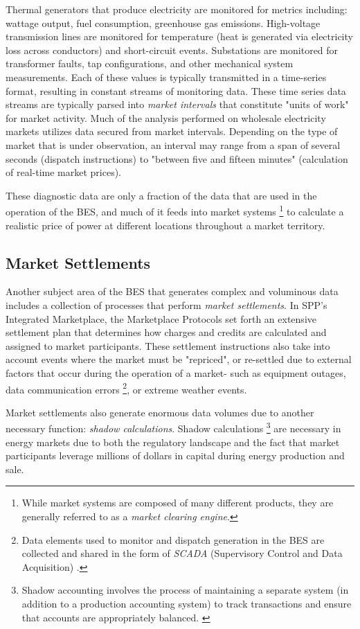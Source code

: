 Thermal generators that produce electricity are monitored for metrics including: wattage output, fuel consumption, greenhouse gas emissions. High-voltage transmission lines are monitored for temperature (heat is generated via electricity loss across conductors) and short-circuit events. Substations are monitored for transformer faults, tap configurations, and other mechanical system measurements. Each of these values is typically transmitted in a time-series format, resulting in constant streams of monitoring data. These time series data streams are typically parsed into \textit{market intervals} that constitute "units of work" for market activity. Much of the analysis performed on wholesale electricity markets utilizes data secured from market intervals. Depending on the type of market that is under observation, an interval may range from a span of several seconds (dispatch instructions) to "between five and fifteen minutes" \cite{ferc1} (calculation of real-time market prices). 

These diagnostic data are only a fraction of the data that are used in the operation of the BES, and much of it feeds into market systems \footnote{While market systems are composed of many different products, they are generally referred to as a \textit{market clearing engine}.} to calculate a realistic price of power at different locations throughout a market territory.

\subsection{Market Settlements}

Another subject area of the BES that generates complex and voluminous data includes a collection of processes that perform \textit{market settlements}. In SPP's Integrated Marketplace, the Marketplace Protocols set forth an extensive settlement plan that determines how charges and credits are calculated and assigned to market participants. These settlement instructions also take into account events where the market must be "repriced", or re-settled due to external factors that occur during the operation of a market- such as equipment outages, data communication errors \footnote{Data elements used to monitor and dispatch generation in the BES are collected and shared in the form of \textit{SCADA} (Supervisory Control and Data Acquisition) \cite{scada1}.}, or extreme weather events.

Market settlements also generate enormous data volumes due to another necessary function: \textit{shadow calculations}. Shadow calculations \footnote{Shadow accounting involves the process of maintaining a separate system (in addition to a production accounting system) to track transactions and ensure that accounts are appropriately balanced. \cite{shadow-acct}} 
are necessary in energy markets due to both the regulatory landscape and the fact that market participants leverage millions of dollars in capital during energy production and sale.

